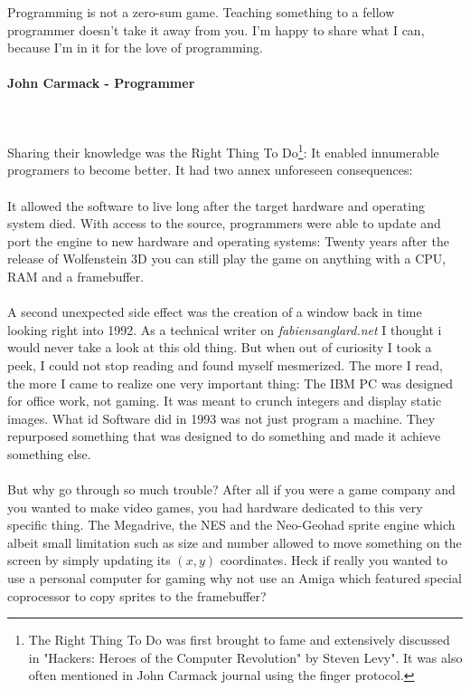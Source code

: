  \begin{fancyquotes}
   Programming is not a zero-sum game. Teaching something to a fellow programmer doesn't take it away from you. I'm happy to share what I can, because I'm in it for the love of programming.\\
   \\
\textbf{John Carmack - Programmer}
 \end{fancyquotes}\\
\\
Sharing their knowledge was the Right Thing To Do\footnote{The Right Thing To Do was first brought to fame and extensively discussed in "Hackers: Heroes of the Computer Revolution" by Steven Levy". It was also often mentioned in John Carmack journal using the finger protocol.}: It enabled innumerable programers to become better. It had two annex unforeseen consequences:\\
\\
It allowed the software to live long after the target hardware and operating system died. With access to the source, programmers were able to update and port the engine to new hardware and operating systems: Twenty years after the release of Wolfenstein 3D you can still play the game on anything with a CPU, RAM and a framebuffer. \\
\\
A second unexpected side effect was the creation of a window back in time looking right into 1992. As a technical writer on \emph{fabiensanglard.net} I thought i would never take a look at this old thing. But when out of curiosity I took a peek, I could not stop reading and found myself mesmerized. The more I read, the more I came to realize one very important thing: The IBM PC was designed for office work, not gaming. It was meant to crunch integers and display static images. What id Software did in 1993 was not just program a machine. They repurposed something that was designed to do something and made it achieve something else.\\
\\
But why go through so much trouble? After all if you were a game company and you wanted to make video games, you had hardware dedicated to this very specific thing. The Megadrive, the NES and the Neo-Geohad sprite engine which albeit small limitation such as size and number allowed to move something on the screen by simply updating  its $(x,y)$ coordinates. Heck if really you wanted to use a personal computer for gaming why not use an Amiga which featured special coprocessor to copy sprites to the framebuffer?\\

